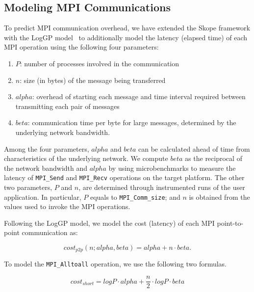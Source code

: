 \subsection{Modeling MPI Communications}

To predict MPI communication overhead, we have extended the Skope framework with the LogGP
model~\cite{loggp} to additionally model the latency (elapsed time) of
each MPI operation using the following four parameters:

\begin{enumerate}

\item $P$: number of processes involved in the communication

\item $n$: size (in bytes) of the message being transferred

\item $alpha$: overhead of starting each message and time interval
  required between transmitting each pair of messages

\item $beta$: communication time per byte for large messages,
  determined by the underlying network bandwidth.

\end{enumerate}

Among the four parameters, $alpha$ and $beta$ can be calculated  ahead of time from
characteristics of the underlying network. We compute
$beta$ as the reciprocal of the network bandwidth and $alpha$ by using
microbenchmarks to measure the latency of \texttt{MPI\_Send} and
\texttt{MPI\_Recv} operations on the target platform.  The other two
parameters, $P$ and $n$, are determined through instrumented
runs of the user application.
In particular,
$P$ equals to \texttt{MPI\_Comm\_size}; and $n$ 
is obtained from the values used to invoke the MPI operations.

Following the LogGP model, we model the cost (latency) of each MPI point-to-point communication
as:

\begin{equation}
cost_{p2p}(n;alpha,beta) = alpha + n\cdot beta .
\end{equation}

To model the \texttt{MPI\_Alltoall} operation, we use the following two
formulas.

\begin{equation}
  cost_{short} = log P\cdot alpha + \frac{n}{2}\cdot log P\cdot beta
\end{equation}

